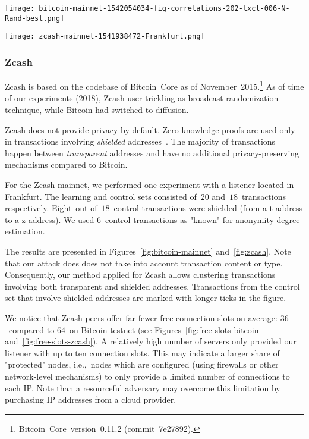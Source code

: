 \begin{figure*}
	\centering
	\begin{minipage}{0.5\textwidth}
		\centering
		\texttt{[image: bitcoin-mainnet-1542054034-fig-correlations-202-txcl-006-N-Rand-best.png]}
		\caption{Transaction clustering for Bitcoin mainnet.}
		\label{fig:bitcoin-mainnet}
	\end{minipage}\hfill
	\begin{minipage}{0.5\textwidth}
		\centering
		\texttt{[image: zcash-mainnet-1541938472-Frankfurt.png]}
		\caption{Transaction clustering for Zcash.}
		\label{fig:zcash}
	\end{minipage}\hfill
\end{figure*}

\subsubsection{Zcash}

Zcash is based on the codebase of Bitcoin~Core as of November~2015.\footnote{Bitcoin~Core~version~0.11.2 (commit~7e27892).}
As of time of our experiments (2018), Zcash user trickling as broadcast randomization technique, while Bitcoin had switched to diffusion.

Zcash does not provide privacy by default.
Zero-knowledge proofs are used only in transactions involving \textit{shielded} addresses~\cite{Kappos2018}.
The majority of transactions happen between \textit{transparent} addresses and have no additional privacy-preserving mechanisms compared to Bitcoin.

For the Zcash mainnet, we performed one experiment with a listener located in Frankfurt.
The learning and control sets consisted of~$20$ and~$18$~transactions respectively.
Eight~out of~$18$~control transactions were shielded (from a t-address to a z-address).
We used $6$~control transactions as "known" for anonymity degree estimation.

The results are presented in Figures~\ref{fig:bitcoin-mainnet} and~\ref{fig:zcash}.
Note that our attack does does not take into account transaction content or type.
Consequently, our method applied for Zcash allows clustering transactions involving both transparent and shielded addresses.
Transactions from the control set that involve shielded addresses are marked with longer ticks in the figure.

We notice that Zcash peers offer far fewer free connection slots on average: $36$~compared to $64$~on Bitcoin testnet (see Figures~\ref{fig:free-slots-bitcoin} and~\ref{fig:free-slots-zcash}).
A relatively high number of servers only provided our listener with up to ten connection slots.
This may indicate a larger share of "protected" nodes, i.e.,~nodes which are configured (using firewalls or other network-level mechanisms) to only provide a limited number of connections to each IP\@.
Note than a resourceful adversary may overcome this limitation by purchasing IP addresses from a cloud provider.

